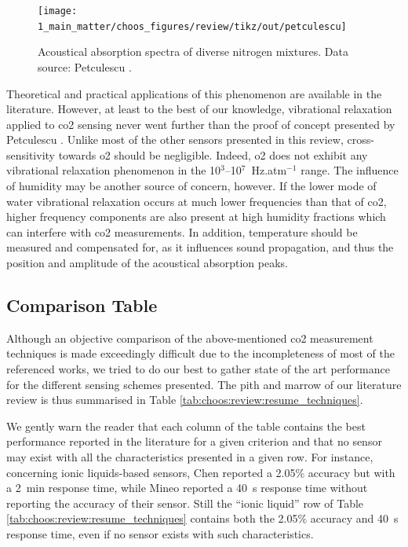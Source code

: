 \begin{figure}
	\centering
	\texttt{[image: 1\_main\_matter/choos\_figures/review/tikz/out/petculescu]}
	\caption[Acoustical absorption spectra of diverse nitrogen mixtures.]{Acoustical absorption spectra of diverse nitrogen mixtures. Data source: Petculescu \etal\cite{petculescu2006a}.}
	\label{fig:choos:review:sound_att}
\end{figure}

Theoretical and practical applications of this phenomenon are available in the literature\cite{dain2001, cottet2004, ejakov2003, petculescu2006a, petculescu2006b, jia2018}. However, at least to the best of our knowledge, vibrational relaxation applied to \gls{co2} sensing never went further than the proof of concept presented by Petculescu \etal{}\cite{petculescu2006b}. Unlike most of the other sensors presented in this review, cross-sensitivity towards \gls{o2} should be negligible. Indeed, \gls{o2} does not exhibit any vibrational relaxation phenomenon in the 10$^3$--10$^7$~Hz.atm$^{-1}$ range\cite{ejakov2003}. The influence of humidity may be another source of concern, however. If the lower mode of water vibrational relaxation occurs at much lower frequencies than that of \gls{co2}\cite{zuckerwar1981}, higher frequency components are also present at high humidity fractions which can interfere with \gls{co2} measurements\cite{ejakov2003}. In addition, temperature should be measured and compensated for, as it influences sound propagation, and thus the position and amplitude of the acoustical absorption peaks\cite{dain2001}.

\subsection{Comparison Table}\label{subsect:choos:review:comp_table}

Although an objective comparison of the above-mentioned \gls{co2} measurement techniques is made exceedingly difficult due to the incompleteness of most of the referenced works, we tried to do our best to gather state of the art performance for the different sensing schemes presented. The pith and marrow of our literature review is thus summarised in Table \ref{tab:choos:review:resume_techniques}.

We gently warn the reader that each column of the table contains the best performance reported in the literature for a given criterion and that no sensor may exist with all the characteristics presented in a given row. For instance, concerning ionic liquids-based sensors, Chen \etal{}\cite{chen2011} reported a 2.05\% accuracy but with a 2~min response time, while Mineo \etal{}\cite{mineo2012} reported a 40~s response time without reporting the accuracy of their sensor. Still the \enquote{ionic liquid} row of Table \ref{tab:choos:review:resume_techniques} contains both the 2.05\% accuracy and 40~s response time, even if no sensor exists with such characteristics.

